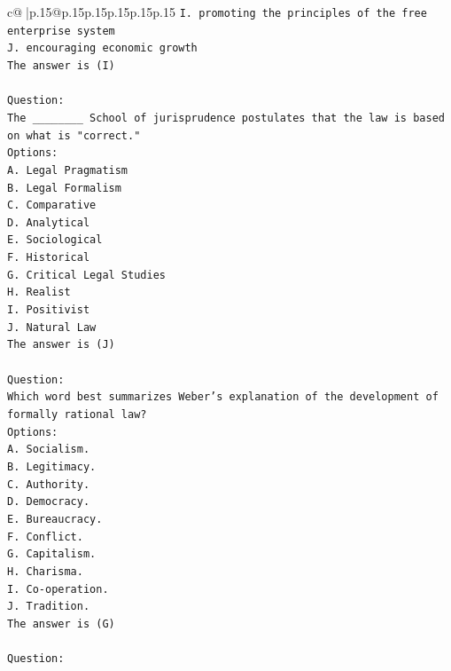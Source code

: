 \documentclass{article}
\begin{document}
{\begin{supertabular}{c@{$\;$}|p{.15\linewidth}@{}p{.15\linewidth}p{.15\linewidth}p{.15\linewidth}p{.15\linewidth}p{.15\linewidth}}
{{{\texttt{I. promoting the principles of the free enterprise system} \\
\texttt{J. encouraging economic growth} \\
\texttt{The answer is (I)} \\
\\ 
\texttt{Question:} \\
\texttt{The \_\_\_\_\_\_\_\_ School of jurisprudence postulates that the law is based on what is "correct."} \\
\texttt{Options:} \\
\texttt{A. Legal Pragmatism} \\
\texttt{B. Legal Formalism} \\
\texttt{C. Comparative} \\
\texttt{D. Analytical} \\
\texttt{E. Sociological} \\
\texttt{F. Historical} \\
\texttt{G. Critical Legal Studies} \\
\texttt{H. Realist} \\
\texttt{I. Positivist} \\
\texttt{J. Natural Law} \\
\texttt{The answer is (J)} \\
\\ 
\texttt{Question:} \\
\texttt{Which word best summarizes Weber's explanation of the development of formally rational law?} \\
\texttt{Options:} \\
\texttt{A. Socialism.} \\
\texttt{B. Legitimacy.} \\
\texttt{C. Authority.} \\
\texttt{D. Democracy.} \\
\texttt{E. Bureaucracy.} \\
\texttt{F. Conflict.} \\
\texttt{G. Capitalism.} \\
\texttt{H. Charisma.} \\
\texttt{I. Co{-}operation.} \\
\texttt{J. Tradition.} \\
\texttt{The answer is (G)} \\
\\ 
\texttt{Question:} \\
}}}
\end{supertabular}}
\end{document}
